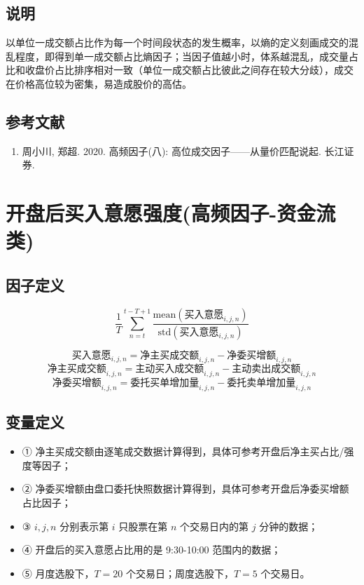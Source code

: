 \documentclass{article}
\begin{document}
\subsection{说明}
以单位一成交额占比作为每一个时间段状态的发生概率，以熵的定义刻画成交的混乱程度，即得到单一成交额占比熵因子；当因子值越小时，体系越混乱，成交量占比和收盘价占比排序相对一致（单位一成交额占比彼此之间存在较大分歧），成交在价格高位较为密集，易造成股价的高估。

\subsection{参考文献}
\begin{enumerate}
    \item 周小川, 郑超. 2020. 高频因子(八): 高位成交因子——从量价匹配说起. 长江证券.
\end{enumerate}

\section{开盘后买入意愿强度(高频因子-资金流类)}

\subsection{因子定义}

\begin{equation}
    \frac{1}{T} \sum_{n=t}^{t-T+1} \frac{\mathrm{mean}(\text{买入意愿}_{i,j,n})}{\mathrm{std}(\text{买入意愿}_{i,j,n})}
\end{equation}

\begin{equation}
    \text{买入意愿}_{i,j,n} = \text{净主买成交额}_{i,j,n} - \text{净委买增额}_{i,j,n}
\end{equation}
\begin{equation}
    \text{净主买成交额}_{i,j,n} = \text{主动买入成交额}_{i,j,n} - \text{主动卖出成交额}_{i,j,n}
\end{equation}
\begin{equation}
    \text{净委买增额}_{i,j,n} = \text{委托买单增加量}_{i,j,n} - \text{委托卖单增加量}_{i,j,n}
\end{equation}


\subsection{变量定义}
\begin{itemize}
    \item ① 净主买成交额由逐笔成交数据计算得到，具体可参考开盘后净主买占比/强度等因子；
    \item ② 净委买增额由盘口委托快照数据计算得到，具体可参考开盘后净委买增额占比因子；
    \item ③ \( i, j, n \) 分别表示第 \( i \) 只股票在第 \( n \) 个交易日内的第 \( j \) 分钟的数据；
    \item ④ 开盘后的买入意愿占比用的是 9:30-10:00 范围内的数据；
    \item ⑤ 月度选股下，\( T=20 \) 个交易日；周度选股下，\( T=5 \) 个交易日。
\end{itemize}
\end{document}
